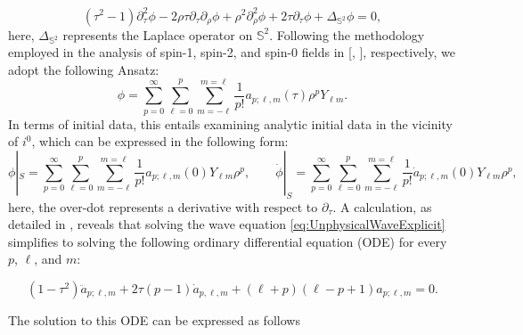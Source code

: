\begin{equation}\label{eq:UnphysicalWaveExplicit}
  \left(\tau^2-1\right) \partial_\tau^2 \phi-2 \rho \tau \partial_\tau \partial_\rho \phi+\rho^2 \partial_\rho^2 \phi+2 \tau \partial_\tau \phi+\Delta_{\mathbb{S}^2} \phi=0,
\end{equation}
here, $\Delta _{\mathbb{S}^{2}{}}{}$ represents the Laplace operator on $\mathbb{S}^2$. Following the methodology employed in the analysis of spin-1, spin-2, and spin-0 fields in [\cite{ValAli22}, \cite{MinMacKro22}], respectively, we adopt the following Ansatz:
\begin{equation}\label{eq:ansatz}
	\phi = \sum_{p = 0}^{\infty}\sum_{\ell = 0}^{p}\sum_{m = -\ell}^{m = \ell}\frac{1}{p!}a_{p;\ell,m}(\tau)\rho^{p}Y_{\ell m}.
\end{equation}
In terms of initial data, this entails examining analytic initial data in the vicinity of $i^0$, which can be expressed in the following form:
\begin{equation}\label{eq:ID_field}
  \phi|_{{S}} =
  \sum_{p=0}^{\infty}
  \sum_{\ell=0}^{p}\sum_{m=-\ell}^{m=\ell}\frac{1}{p!}a_{p;\ell,m}(0)Y_{\ell
    m}\rho^p, \qquad \dot{\phi}|_{{S}} =
  \sum_{p=0}^{\infty}\sum_{\ell=0}^{p}\sum_{m=-\ell}^{m=\ell}
  \frac{1}{p!}\dot{a}_{p;\ell,m}(0)Y_{\ell
    m}\rho^p,
\end{equation}
here, the over-dot represents a derivative with respect to $\partial_\tau$. A calculation, as detailed in \cite{MinMacKro22}, reveals that solving the wave equation \eqref{eq:UnphysicalWaveExplicit} simplifies to solving the following ordinary differential equation (ODE) for every $p$, $\ell$, and $m$:

\begin{equation}\label{eq:ODE_wave_JacobiPoly}
  (1-\tau^2)\ddot{a}_{p;\ell,m} +
    2\tau(p-1)\dot{a}_{p,\ell,m}+(\ell+p)(\ell-p+1){a}_{p;\ell,m}=0.
\end{equation}

\noindent The solution to this ODE can be expressed as follows

